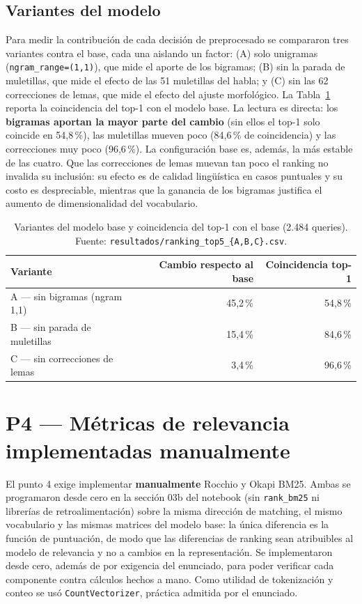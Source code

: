 \documentclass[11pt]{tg_usta}
\begin{document}
\subsection{Variantes del modelo}

Para medir la contribución de cada decisión de preprocesado se compararon tres variantes contra el base, cada una aislando un factor: (A) solo unigramas (\texttt{ngram\_range=(1,1)}), que mide el aporte de los bigramas; (B) sin la parada de muletillas, que mide el efecto de las 51 muletillas del habla; y (C) sin las 62 correcciones de lemas, que mide el efecto del ajuste morfológico. La Tabla~\ref{tab:variantes} reporta la coincidencia del top-1 con el modelo base. La lectura es directa: los \textbf{bigramas aportan la mayor parte del cambio} (sin ellos el top-1 solo coincide en 54,8\,\%), las muletillas mueven poco (84,6\,\% de coincidencia) y las correcciones muy poco (96,6\,\%). La configuración base es, además, la más estable de las cuatro. Que las correcciones de lemas muevan tan poco el ranking no invalida su inclusión: su efecto es de calidad lingüística en casos puntuales y su costo es despreciable, mientras que la ganancia de los bigramas justifica el aumento de dimensionalidad del vocabulario.

\begin{table}[htbp]
    \centering
    \caption{Variantes del modelo base y coincidencia del top-1 con el base (2.484 queries). Fuente: \texttt{resultados/ranking\_top5\_\{A,B,C\}.csv}.}
    \small
    \setlength{\tabcolsep}{6pt}
    \begin{tabular}{l r r}
    \toprule
    Variante & Cambio respecto al base & Coincidencia top-1 \\
    \midrule
    A --- sin bigramas (ngram 1,1) & 45,2\,\% & 54,8\,\% \\
    B --- sin parada de muletillas & 15,4\,\% & 84,6\,\% \\
    C --- sin correcciones de lemas & 3,4\,\% & 96,6\,\% \\
    \bottomrule
    \end{tabular}
    \label{tab:variantes}
\end{table}


\section{P4 --- Métricas de relevancia implementadas manualmente}\label{sec:p4}

El punto 4 exige implementar \textbf{manualmente} Rocchio y Okapi BM25. Ambas se programaron desde cero en la sección 03b del notebook (sin \texttt{rank\_bm25} ni librerías de retroalimentación) sobre la misma dirección de matching, el mismo vocabulario y las mismas matrices del modelo base: la única diferencia es la función de puntuación, de modo que las diferencias de ranking sean atribuibles al modelo de relevancia y no a cambios en la representación. Se implementaron desde cero, además de por exigencia del enunciado, para poder verificar cada componente contra cálculos hechos a mano. Como utilidad de tokenización y conteo se usó \texttt{CountVectorizer}, práctica admitida por el enunciado.
\end{document}
